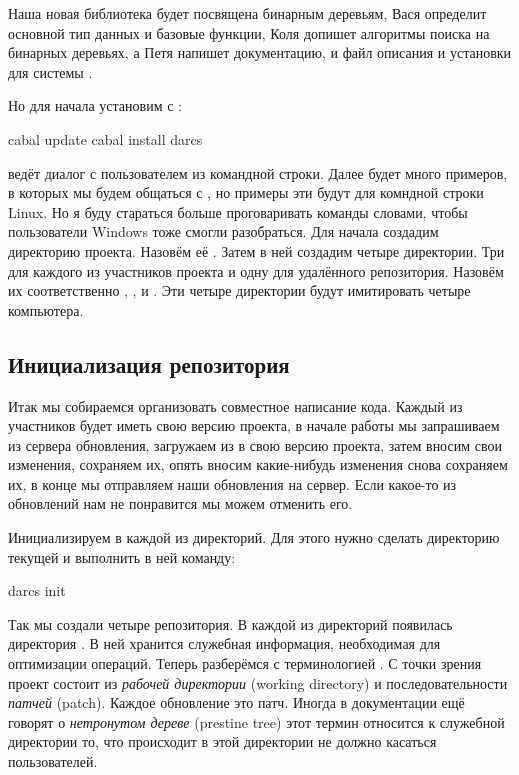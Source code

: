 Наша новая библиотека будет посвящена бинарным деревьям,
Вася определит основной тип данных и базовые функции, 
Коля допишет алгоритмы поиска на бинарных деревьях,
а Петя напишет документацию, и файл описания и установки
для системы .

Но для начала установим  с :

\begin{code}
cabal update
cabal install darcs
\end{code}

 ведёт диалог с пользователем из командной
строки. Далее будет много примеров, в которых мы будем
общаться с , но примеры эти будут для комндной
строки Linux. Но я буду стараться больше проговаривать 
команды словами, чтобы пользователи Windows тоже 
смогли разобраться. Для начала создадим директорию проекта.
Назовём её . Затем в ней создадим четыре
директории. Три для каждого из участников проекта и одну для 
удалённого репозитория. Назовём их соответственно
, ,  и .
Эти четыре директории будут имитировать четыре
компьютера. 

\subsection{Инициализация репозитория}

Итак мы собираемся организовать совместное написание кода.
Каждый из участников будет иметь свою версию проекта,
в начале работы мы запрашиваем из сервера обновления,
загружаем из в свою версию проекта, затем вносим свои 
изменения, сохраняем их, опять вносим
какие-нибудь изменения снова сохраняем их, в конце мы
отправляем наши обновления на сервер. 
Если какое-то из обновлений нам не понравится мы можем 
отменить его. 

Инициализируем  в каждой из
директорий. Для этого нужно сделать директорию текущей
и выполнить в ней команду:

\begin{code}
darcs init
\end{code}

Так мы создали четыре репозитория. В каждой из директорий 
появилась директория .
В ней хранится служебная информация, необходимая для 
оптимизации операций.
Теперь разберёмся с терминологией . С точки
зрения  проект состоит из \emph{рабочей директории}
(working directory) и последовательности \emph{патчей} (patch). 
Каждое обновление это патч. Иногда в документации ещё говорят
о \emph{нетронутом дереве} (prestine tree) этот термин 
относится к служебной директории 
то, что происходит в этой директории не должно касаться 
пользователей. 

